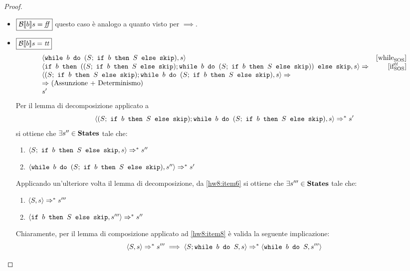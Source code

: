 \begin{proof}
\begin{itemize}
  \item $\boxed{\B{b} = \semfalse}$ questo caso è analogo a quanto visto per
    $\boxed{\implies}$.
  \item $\boxed{\B{b} = \semtrue}$
  $$
  \begin{array}{lr}
  \confSs{\wbS{b}{(S;\ \ifABC{b}{S}{\skipForFriends})}}{s} & \whileSOS \\
  \confSs{\ifABC{b}
            {((S;\ \ifABC{b}{S}{\skipForFriends});
              \wbS{b}{(S;\ \ifABC{b}{S}{\skipForFriends})})}
            {\skipForFriends}
         }{s} \Rar{ }& \ifttSOS \\
  \confSs{  (S;\ \ifABC{b}{S}{\skipForFriends});
            \wbS{b}{(S;\ \ifABC{b}{S}{\skipForFriends})}
         }{s} \Rar{ }\\
  \Rar{ } (\text{Assunzione + Determinismo})\\
  s'
  \end{array}
  $$
  Per il lemma di decomposizione applicato a
  \begin{equation}
  \confSs{  (S;\ \ifABC{b}{S}{\skipForFriends});
            \wbS{b}{(S;\ \ifABC{b}{S}{\skipForFriends})}
         }{s}
    \Rar{*} s'
  \label{eq:hw8:isimpl}
  \end{equation}
  si ottiene che $\exists s'' \in \states$ tale che:
  \begin{enumerate}[label=(\alph*)]
    \item $\confSs{S;\ \ifABC{b}{S}{\skipForFriends}}{s} \Rar{*} s''$
    \label{hw8:item6}
    \item $\confSs{\wbS{b}{(S;\ \ifABC{b}{S}{\skipForFriends})}}{s''}
      \Rar{*} s'$
    \label{hw8:item7}
  \end{enumerate}
  Applicando un'ulteriore volta il lemma di decomposizione, da \ref{hw8:item6}
  si ottiene che $\exists{s'''}\in\states$ tale che:
  \begin{enumerate}[label=(\alph*)]
    \item $\confSs{S}{s} \Rar{*} s'''$
    \label{hw8:item8}
    \item $\confSs{\ifABC{b}{S}{\skipForFriends}}{s'''} \Rar{*} s''$
    \label{hw8:item9}
  \end{enumerate}
  Chiaramente, per il lemma di composizione applicato ad \ref{hw8:item8} è
  valida la seguente implicazione:
  \begin{equation}
  \confSs{S}{s} \Rar{*} s'''
    \implies
  \confSs{S; \wbS{b}{S}}{s} \Rar{*} \confSs{\wbS{b}{S}}{s'''}
  \label{eq:hw8:item10}

\end{equation}
\end{itemize}
\end{proof}
